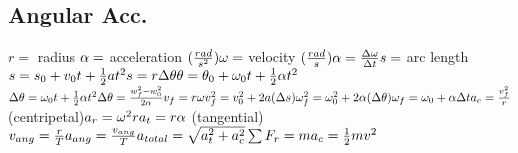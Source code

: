 \documentclass[11pt]{article}
\begin{document}
\begin{paracol}{3}
        \section*{Angular Acc.}
        \begin{fleqn}
            $
            r = $ radius $ \newline
            \alpha = $ acceleration $ (\frac{rad}{s^2}) \newline
            \omega = $ velocity $ (\frac{rad}{s}) \newline
            \alpha = \frac{\Delta \omega}{\Delta t} \newline
            s = $ arc length $ \newline
            s=s_0 + v_0t + \frac{1}{2}at^2 \newline
            s = r \Delta \theta \newline
            \theta = \theta_0 + \omega_0 t + \frac{1}{2}\alpha t^2  \newline $
            \switchcolumn$\newline
            \Delta \theta = \omega_0 t + \frac{1}{2}\alpha t^2  \newline
            \Delta \theta = \frac{w^2_f - w^2_0}{2 \alpha} \newline
            v_f = r\omega \newline
            v^2_f = v_0^2+2a(\Delta s)  \newline
            \omega^2_f = \omega_0 ^2 + 2 \alpha (\Delta \theta) \newline
            \omega_f = \omega_0 + \alpha \Delta t  \newline
            a_c = \frac{v^2_f}{r} $ (centripetal)$\newline
            a_r = \omega^{2}r \newline
            a_t = r \alpha $ (tangential) $ \newline
            v_{ang} = \frac{r}{T} \newline
            a_{ang} = \frac{v_{ang}}{T} \newline
            a_{total} = \sqrt{a_t^2+a_c^2} \newline
            \sum F_r = ma_c = \frac{1}{2}mv^2
            $
        \end{fleqn}

\end{paracol}
\end{document}
